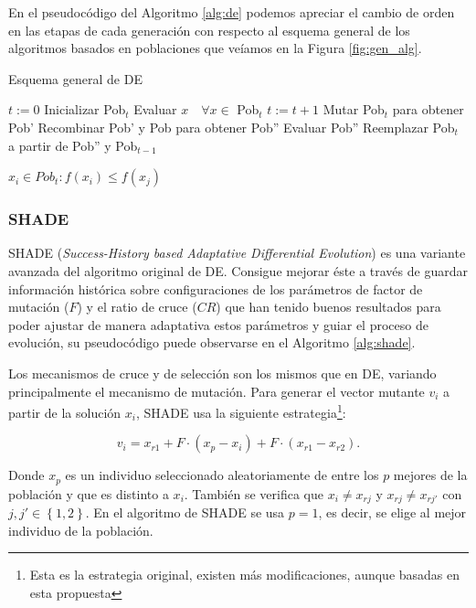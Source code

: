 En el pseudocódigo del Algoritmo \ref{alg:de} podemos apreciar el cambio de orden en las etapas de cada generación con respecto al esquema general de los algoritmos basados en poblaciones que veíamos en la Figura \ref{fig:gen_alg}.

\begin{algorithm}
\caption{Esquema general de DE}
\label{alg:de}
	\begin{algorithmic}
		\State $t:=0$
		\State Inicializar Pob$_t$
		\State Evaluar $x \quad \forall x \in$ Pob$_t$
			\State $t:=t+1$			
			\State Mutar Pob$_t$ para obtener Pob'
			\State Recombinar Pob' y Pob para obtener Pob'' 
			\State Evaluar Pob''			
			\State Reemplazar Pob$_t$ a partir de Pob'' y Pob$_{t-1}$
		\EndWhile
		
		
		\Return $x_i \in Pob_t : f(x_i)\leq f(x_j)$
	\end{algorithmic}
\end{algorithm}		
		
	



\subsubsection{SHADE}

SHADE (\textit{Success-History based Adaptative Differential Evolution}) \cite{shade} es una variante avanzada del algoritmo original de DE. Consigue mejorar éste a través de guardar información histórica sobre configuraciones de los parámetros de factor de mutación ($F$) y el ratio de cruce ($CR$) que han tenido buenos resultados para poder ajustar de manera adaptativa estos parámetros y guiar el proceso de evolución, su pseudocódigo puede observarse en el Algoritmo \ref{alg:shade}. 

Los mecanismos de cruce y de selección son los mismos que en DE, variando principalmente el mecanismo de mutación. Para generar el vector mutante $v_i$ a partir de la solución $x_i$, SHADE usa la siguiente estrategia\footnote{Esta es la estrategia original, existen más modificaciones, aunque basadas en esta propuesta}:

$$v_i = x_{r1} + F \cdot (x_p - x_i)  + F \cdot (x_{r1} - x_{r2}).$$

Donde $x_p$ es un individuo seleccionado aleatoriamente de entre los $p$ mejores de la población y que es distinto a $x_i$. También se verifica que $x_i  \neq x_{rj}$ y $x_{rj} \neq x_{rj'}$ con $j, j' \in \left \{ 1,2 \right \}$. En el algoritmo de SHADE se usa $p=1$, es decir, se elige al mejor individuo de la población.

